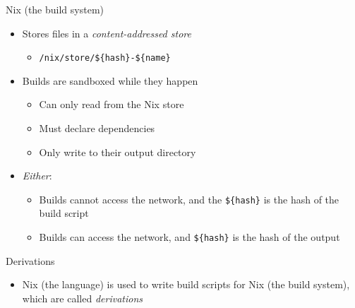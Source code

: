 \documentclass[aspectratio=169, notes]{beamer}
\begin{document}
\begin{frame}{Nix (the build system)}
	\begin{itemize}
		\item Stores files in a \emph{content-addressed store}
		      \begin{itemize}
			      \item \texttt{/nix/store/\$\{hash\}-\$\{name\}}
		      \end{itemize}
		\item Builds are sandboxed while they happen
		      \begin{itemize}
			      \item Can only read from the Nix store
			      \item Must declare dependencies
			      \item Only write to their output directory
		      \end{itemize}
		\item \emph{Either}:
		      \begin{itemize}
			      \item Builds cannot access the network, and the \texttt{\$\{hash\}} is the hash of the build script
			      \item Builds can access the network, and \texttt{\$\{hash\}} is the hash of the output
		      \end{itemize}
	\end{itemize}
\end{frame}

\begin{frame}{Derivations}
	\begin{itemize}
		\item Nix (the language) is used to write build scripts for Nix (the build system), which are called \emph{derivations}
	\end{itemize}
	
\end{frame}
\end{document}
